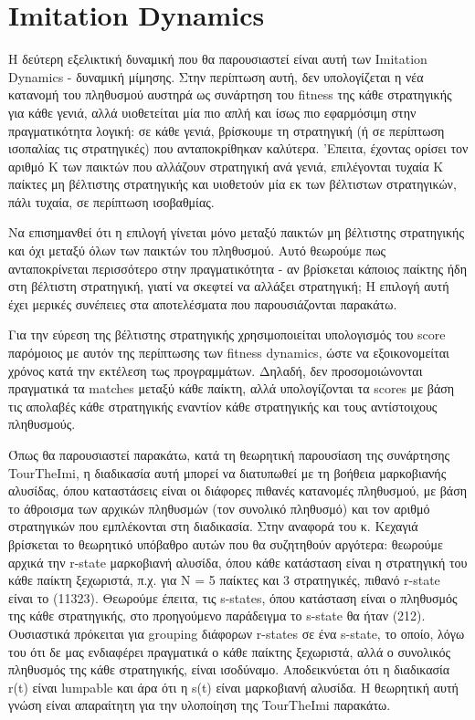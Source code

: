 \documentclass[12pt]{article}
\begin{document}
\clearpage
\section{Imitation Dynamics}
Η δεύτερη εξελικτική δυναμική που θα παρουσιαστεί είναι αυτή των Imitation Dynamics - δυναμική μίμησης. Στην περίπτωση αυτή, δεν υπολογίζεται η νέα κατανομή του πληθυσμού αυστηρά ως συνάρτηση του fitness της κάθε στρατηγικής για κάθε γενιά, αλλά υιοθετείται μία πιο απλή και ίσως πιο εφαρμόσιμη στην πραγματικότητα λογική: σε κάθε γενιά, βρίσκουμε τη στρατηγική (ή σε περίπτωση ισοπαλίας τις στρατηγικές) που ανταποκρίθηκαν καλύτερα. 'Επειτα, έχοντας ορίσει τον αριθμό K των παικτών που αλλάζουν στρατηγική ανά γενιά, επιλέγονται τυχαία K παίκτες μη βέλτιστης στρατηγικής και υιοθετούν μία εκ των βέλτιστων στρατηγικών, πάλι τυχαία, σε περίπτωση ισοβαθμίας. 

Να επισημανθεί ότι η επιλογή γίνεται μόνο μεταξύ παικτών μη βέλτιστης στρατηγικής και όχι μεταξύ όλων των παικτών του πληθυσμού. Αυτό θεωρούμε πως ανταποκρίνεται περισσότερο στην πραγματικότητα - αν βρίσκεται κάποιος παίκτης ήδη στη βέλτιστη στρατηγική, γιατί να σκεφτεί να αλλάξει στρατηγική; Η επιλογή αυτή έχει μερικές συνέπειες στα αποτελέσματα που παρουσιάζονται παρακάτω.

Για την εύρεση της βέλτιστης στρατηγικής χρησιμοποιείται υπολογισμός του score παρόμοιος με αυτόν της περίπτωσης των fitness dynamics, ώστε να εξοικονομείται χρόνος κατά την εκτέλεση τως προγραμμάτων. Δηλαδή, δεν προσομοιώνονται πραγματικά τα matches μεταξύ κάθε παίκτη, αλλά υπολογίζονται τα scores με βάση τις απολαβές κάθε στρατηγικής εναντίον κάθε στρατηγικής και τους αντίστοιχους πληθυσμούς.

Όπως θα παρουσιαστεί παρακάτω, κατά τη θεωρητική παρουσίαση της συνάρτησης TourTheImi, η διαδικασία αυτή μπορεί να διατυπωθεί με τη βοήθεια μαρκοβιανής αλυσίδας, όπου καταστάσεις είναι οι διάφορες πιθανές κατανομές πληθυσμού, με βάση το άθροισμα των αρχικών πληθυσμών (τον συνολικό πληθυσμό) και τον αριθμό στρατηγικών που εμπλέκονται στη διαδικασία. Στην αναφορά του κ. Κεχαγιά βρίσκεται το θεωρητικό υπόβαθρο αυτών που θα συζητηθούν αργότερα: θεωρούμε αρχικά την r-state μαρκοβιανή αλυσίδα, όπου κάθε κατάσταση είναι η στρατηγική του κάθε παίκτη ξεχωριστά, π.χ. για N = 5 παίκτες και 3 στρατηγικές, πιθανό r-state είναι το (11323). Θεωρούμε έπειτα, τις s-states, όπου κατάσταση είναι ο πληθυσμός της κάθε στρατηγικής, στο προηγούμενο παράδειγμα το s-state θα ήταν (212). Ουσιαστικά πρόκειται για grouping διάφορων r-states σε ένα s-state, το οποίο, λόγω του ότι δε μας ενδιαφέρει πραγματικά ο κάθε παίκτης ξεχωριστά, αλλά ο συνολικός πληθυσμός της κάθε στρατηγικής, είναι ισοδύναμο. Αποδεικνύεται ότι η διαδικασία r(t) είναι lumpable και άρα ότι η s(t) είναι μαρκοβιανή αλυσίδα. Η θεωρητική αυτή γνώση είναι απαραίτητη για την υλοποίηση της TourTheImi παρακάτω.
\end{document}
